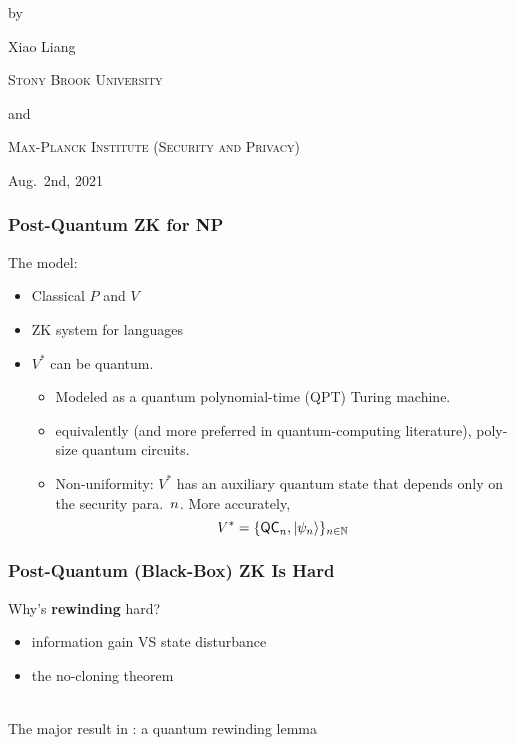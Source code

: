 \documentclass[aspectratio=1610, 12pt, xcolor={dvipsnames}]{beamer}
\begin{document}
 

{ %
\begin{frame}
\vspace{4em}
\centerline{\Large{}}
\vspace{3em}
\centerline{}
\vspace{1em}
\centerline{by}
\vspace{1em}
\centerline{Xiao Liang}
\vspace{2em}
\centerline{\small\textsc{Stony Brook University}}
\centerline{\small and}
\centerline{\small\textsc{Max-Planck Institute (Security and Privacy)}}
\vspace{1em}
\centerline{\small Aug.\ 2nd, 2021}
\end{frame}
}

\begin{frame}
\frametitle{Post-Quantum ZK for NP}

The model:
\begin{itemize}
\item
Classical $P$ and $V$
\item
ZK system for \NP languages
\item
$V^*$ can be quantum. 
\begin{itemize}
\item
Modeled as a quantum polynomial-time (QPT) Turing machine.
\item
equivalently (and more preferred in quantum-computing literature), poly-size quantum circuits. 
\item 
Non-uniformity: $V^*$ has an auxiliary quantum state that depends only on the security para.\ $n$. More accurately,
$$V^* = \{\mathsf{QC}_n, \ket{\psi_n}\}_{n\in \mathbb{N}}$$
\end{itemize}
\end{itemize}


\end{frame}


\begin{frame}
\frametitle{Post-Quantum (Black-Box) ZK Is Hard}

Why's {\bf rewinding} hard?
\begin{itemize}
\item
    information gain VS state disturbance
\item
 the no-cloning theorem
\end{itemize}
~\\
The major result in \cite{DBLP:conf/stoc/Watrous06}: a quantum rewinding lemma 
\end{frame}
\end{document}
